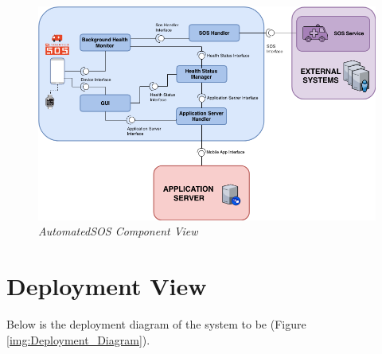 \begin{figure}[H]
  \begin{center}
  	\includegraphics[width=\textwidth]{./img/Automated_Component.png}
    \hspace{0.05\linewidth}
    \centering
    \caption{\textit{AutomatedSOS Component View}}
		\label{img:AutomatedComponent}
    \end{center}
\end{figure}

\clearpage

\section{Deployment View}
Below is the deployment diagram of the system to be (Figure \ref{img:Deployment_Diagram}).

